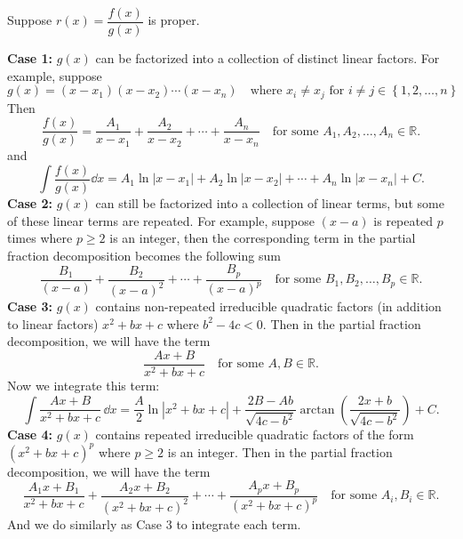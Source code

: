     \begin{methodenv}
        Suppose $r(x)=\dfrac{f(x)}{g(x)}$ is proper.

        \textbf{Case 1:}
        $g(x)$ can be factorized into a collection of distinct linear factors. For example, suppose
        \[
        g(x)=(x-x_1)(x-x_2)\cdots (x-x_n) \quad \text{where } x_i \neq x_j \text{ for } i\neq j \in \left\{ 1, 2, \ldots, n \right\}
        \]
        Then
        \[
        \frac{f(x)}{g(x)}=\frac{A_1}{x-x_1} + \frac{A_2}{x-x_2} + \cdots + \frac{A_n}{x-x_n}\quad \text{for some } A_1, A_2, \ldots, A_n \in \mathbb{R}.
        \]
        and
        \[
        \int \frac{f(x)}{g(x)} \dd x = A_1 \ln |x-x_1| + A_2 \ln |x-x_2| + \cdots + A_n \ln |x-x_n| + C.
        \]
        \indent
        \textbf{Case 2:}
        $g(x)$ can still be factorized into a collection of linear terms, but some of these linear terms are repeated. For example, suppose $(x-a)$ is repeated $p$ times where $p\ge 2$ is an integer, then the corresponding term in the partial fraction decomposition becomes the following sum
        \[
        \frac{B_1}{(x-a)} + \frac{B_2}{(x-a)^2} + \cdots + \frac{B_p}{(x-a)^p}\quad \text{for some } B_1, B_2, \ldots, B_p \in \mathbb{R}.
        \]
        \indent
        \textbf{Case 3:}
        $g(x)$ contains non-repeated irreducible quadratic factors (in addition to linear factors) $x^2 + bx + c$ where $b^2 - 4c < 0$. Then in the partial fraction decomposition, we will have the term
        \[
        \frac{Ax+B}{x^2 + bx + c}\quad \text{for some } A,B \in \mathbb{R}.
        \]
        Now we integrate this term:
        \[
        \int \frac{Ax+B}{x^2 + bx + c}\, \dd x = \frac{A}{2} \ln |x^2 + bx + c| + \frac{2B - Ab}{\sqrt{4c - b^2}} \arctan \left( \frac{2x + b}{\sqrt{4c - b^2}} \right) + C.
        \]
        \indent
        \textbf{Case 4:}
        $g(x)$ contains repeated irreducible quadratic factors of the form $(x^2 + bx + c)^p$ where $p\ge 2$ is an integer. Then in the partial fraction decomposition, we will have the term
        \[
        \frac{A_1 x + B_1}{x^2 + bx + c} + \frac{A_2 x + B_2}{(x^2 + bx + c)^2} + \cdots + \frac{A_p x + B_p}{(x^2 + bx + c)^p}\quad \text{for some } A_i, B_i \in \mathbb{R}.
        \]
        And we do similarly as Case 3 to integrate each term.
    \end{methodenv}

    \newpage